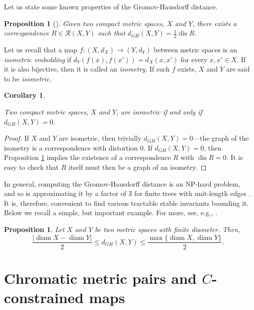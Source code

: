 \documentclass[8pt,a4paper,oneside,english,english]{article}
\theoremstyle{plain}
\theoremstyle
{plain}
\newtheorem{proposition}[theorem]{Proposition}%
\newtheorem{corollary}[theorem]{Corollary}%
\theoremstyle{definition}
\newcommand{\GH}{d_{GH}}
\DeclareMathOperator{\diam}{diam}
\DeclareMathOperator{\dis}{dis}
\begin{document}
Let us state some known properties of the Gromov-Hausdorff distance.

\begin{proposition}[\cite{ChoMem_geo}]\label{prop:distortion_minimizing_correspondence}
    Given two compact metric spaces, $X$ and $Y$, there exists a correspondence $R\in\mathcal R(X,Y)$ such that $\GH(X,Y)=\frac{1}{2}\dis R.$
\end{proposition}

Let us recall that a map $f\colon(X,d_X)\to(Y,d_Y)$ between metric spaces is an {\em isometric embedding} if  $d_Y(f(x),f(x'))=d_X(x,x')$ for every $x,x'\in X$. If it is also bijective, then it is called an {\em isometry}. If such $f$ exists, $X$ and $Y$ are said to be {\em isometric}.

\begin{corollary}\label{coro:0-GH}
    
    Two compact metric spaces, $X$ and $Y$, are isometric if and only if $\GH(X,Y)=0$.
\end{corollary}
\begin{proof}
    If $X$ and $Y$ are isometric, then trivially $\GH(X,Y)=0$---the graph of the isometry is a correspondence with distortion $0$. 
    If $\GH(X,Y)=0$, then Proposition \ref{prop:distortion_minimizing_correspondence} implies the existence of a correspondence $R$ with $\dis R=0$. It is easy to check that $R$ itself must then be a graph of an isometry.
    
\end{proof}

In general, computing the Gromov-Hausdorff distance is an NP-hard problem, and so is approximating it by a factor of $3$ for finite trees with unit-length edges \cite{AgaFoxNatSidWan,Sch}.
It is, therefore, convenient to find various tractable stable invariants bounding it.
Below we recall a 
simple, but important example. For more, see, e.g., \cite{Mem12}.
\begin{proposition}\label{prop:GH_and_diam}
    Let $X$ and $Y$ be two metric spaces with finite diameter. Then,
    \[
    \frac{\lvert\diam X-\diam Y\rvert}{2}\leq \GH(X,Y)\leq \frac{\max\{\diam X,\diam Y\}}{2}.
    \]
\end{proposition}



\section{Chromatic metric pairs and $C$-constrained maps}\label{sec:chromatic_metric_pairs}
\end{document}
